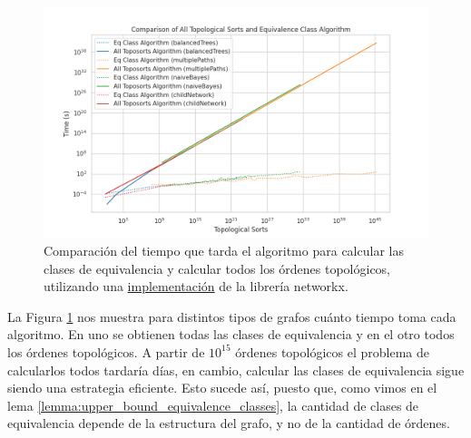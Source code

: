 \begin{figure}[ht]
    \centering
    \includegraphics[width=1\linewidth]{img/equivalentClassesVsAllToposorts_time.png}
    \caption[Caption for image]{Comparación del tiempo que tarda el algoritmo para calcular las clases de equivalencia y calcular todos los órdenes topológicos, utilizando una \href{https://networkx.org/documentation/stable/reference/algorithms/generated/networkx.algorithms.dag.all_topological_sorts.html}{implementación} de la librería networkx. \footnotemark }
    \label{fig:equivalenceClassesVsToposortsTimePlot}
\end{figure}



La Figura \ref{fig:equivalenceClassesVsToposortsTimePlot} nos muestra para distintos tipos de grafos cuánto tiempo toma cada algoritmo. En uno se obtienen todas las clases de equivalencia y en el otro todos los órdenes topológicos. A partir de $10^{15}$ órdenes topológicos el problema de calcularlos todos tardaría días, en cambio, calcular las clases de equivalencia sigue siendo una estrategia eficiente. Esto sucede así, puesto que, como vimos en el lema \ref{lemma:upper_bound_equivalence_classes}, la cantidad de clases de equivalencia depende de la estructura del grafo, y no de la cantidad de órdenes.

